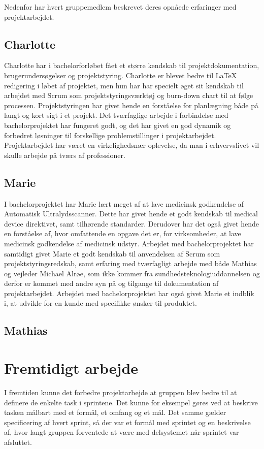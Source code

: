 Nedenfor har hvert gruppemedlem beskrevet deres opnåede erfaringer med projektarbejdet. 

\subsection{Charlotte}
Charlotte har i bachelorforløbet fået et større kendskab til projektdokumentation, brugerundersøgelser og projektstyring. Charlotte er blevet bedre til LaTeX redigering i løbet af projektet, men hun har har specielt øget sit kendskab til arbejdet med Scrum som projektstyringsværktøj og burn-down chart til at følge processen. Projektstyringen har givet hende en forståelse for planlægning både på langt og kort sigt i et projekt. Det tværfaglige arbejde i forbindelse med bachelorprojektet har fungeret godt, og det har givet en god dynamik og forbedret løsninger til forskellige problemstillinger i projektarbejdet. Projektarbejdet har været en virkelighedsnær oplevelse, da man i erhvervslivet vil skulle arbejde på tværs af professioner. 

\subsection{Marie}
I bachelorprojektet har Marie lært meget af at lave medicinsk godkendelse af Automatisk Ultralydsscanner. Dette har givet hende et godt kendskab til medical device direktivet, samt tilhørende standarder. Derudover har det også givet hende en forståelse af, hvor
omfattende en opgave det er, for virksomheder, at lave medicinsk godkendelse af medicinsk udstyr. Arbejdet med bachelorprojektet har samtidigt givet Marie et godt kendskab til anvendelsen af Scrum som projektstyringsredskab, samt erfaring med tværfagligt arbejde med både Mathias og vejleder Michael Alrøe, som ikke kommer fra sundhedsteknologiuddannelsen og derfor er kommet med andre syn på og tilgange til dokumentation af projektarbejdet. Arbejdet med bachelorprojektet har også givet Marie et indblik i, at udvikle for en kunde med specifikke ønsker til produktet. 

\subsection{Mathias}

\section{Fremtidigt arbejde}
I fremtiden kunne det forbedre projektarbejde at gruppen blev bedre til at definere de enkelte task i sprintene. Det kunne for eksempel gøres ved at beskrive tasken målbart med et formål, et omfang og et mål. Det samme gælder specificering af hvert sprint, så der var et formål med sprintet og en beskrivelse af, hvor langt gruppen forventede at være med delsystemet når sprintet var afsluttet.

